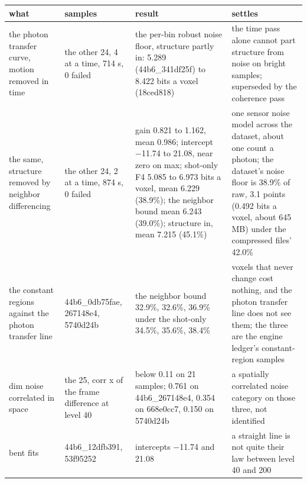 {\footnotesize
\setlength{\tabcolsep}{6pt}
\begin{longtable}{>{\RaggedRight\arraybackslash}p{}>{\RaggedRight\arraybackslash}p{}>{\RaggedRight\arraybackslash}p{}>{\RaggedRight\arraybackslash}p{}}
\toprule
what & samples & result & settles \\
\midrule
\endhead
the photon transfer curve, motion removed in time & the other 24, 4 at a time, 714 s, 0 failed & the per-bin robust noise floor, structure partly in: 5.289 (44b6\_\allowbreak{}341df25f) to 8.422 bits a voxel (18ced818) & the time pass alone cannot part structure from noise on bright samples; superseded by the coherence pass \\
the same, structure removed by neighbor differencing & the other 24, 2 at a time, 874 s, 0 failed & gain 0.821 to 1.162, mean 0.986; intercept −11.74 to 21.08, near zero on max; shot-only F4 5.085 to 6.973 bits a voxel, mean 6.229 (38.9\%); the neighbor bound mean 6.243 (39.0\%); structure in, mean 7.215 (45.1\%) & one sensor noise model across the dataset, about one count a photon; the dataset's noise floor is 38.9\% of raw, 3.1 points (0.492 bits a voxel, about 645 MB) under the compressed files' 42.0\% \\
the constant regions against the photon transfer line & 44b6\_\allowbreak{}0db75fae, 267148e4, 5740d24b & the neighbor bound 32.9\%, 32.6\%, 36.9\% under the shot-only 34.5\%, 35.6\%, 38.4\% & voxels that never change cost nothing, and the photon transfer line does not see them; the three are the engine ledger's constant-region samples \\
dim noise correlated in space & the 25, corr x of the frame difference at level 40 & below 0.11 on 21 samples; 0.761 on 44b6\_\allowbreak{}267148e4, 0.354 on 668e0cc7, 0.150 on 5740d24b & a spatially correlated noise category on those three, not identified \\
bent fits & 44b6\_\allowbreak{}12dfb391, 53f95252 & intercepts −11.74 and 21.08 & a straight line is not quite their law between level 40 and 200 \\
\bottomrule
\end{longtable}
}
